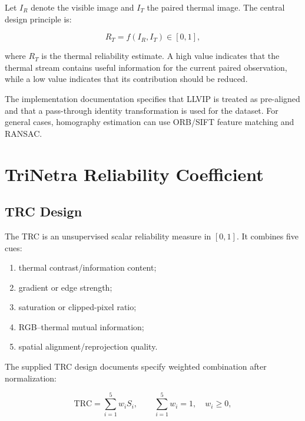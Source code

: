 \documentclass[conference]{IEEEtran}
\begin{document}
Let $I_R$ denote the visible image and $I_T$ the paired thermal image. The central design principle is:

\begin{equation}
R_T = f(I_R,I_T) \in [0,1],
\label{eq:trc_general}
\end{equation}

where $R_T$ is the thermal reliability estimate. A high value indicates that the thermal stream contains useful information for the current paired observation, while a low value indicates that its contribution should be reduced.

The implementation documentation specifies that LLVIP is treated as pre-aligned and that a pass-through identity transformation is used for the dataset. For general cases, homography estimation can use ORB/SIFT feature matching and RANSAC.


\section{TriNetra Reliability Coefficient}

\subsection{TRC Design}

The TRC is an unsupervised scalar reliability measure in $[0,1]$. It combines five cues:

\begin{enumerate}
    \item thermal contrast/information content;
    \item gradient or edge strength;
    \item saturation or clipped-pixel ratio;
    \item RGB--thermal mutual information;
    \item spatial alignment/reprojection quality.
\end{enumerate}

The supplied TRC design documents specify weighted combination after normalization:

\begin{equation}
\mathrm{TRC}=\sum_{i=1}^{5}w_iS_i,
\qquad
\sum_{i=1}^{5}w_i=1,\quad w_i\geq 0,
\label{eq:trc}
\end{equation}
\end{document}
